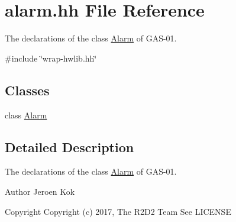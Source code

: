 \hypertarget{alarm_8hh}{}\section{alarm.\+hh File Reference}
\label{alarm_8hh}


The declarations of the class \hyperlink{class_alarm}{Alarm} of G\+A\+S-\/01.  


{\ttfamily \#include \char`\"{}wrap-\/hwlib.\+hh\char`\"{}}\newline
\subsection*{Classes}
\begin{DoxyCompactItemize}
\item 
class \hyperlink{class_alarm}{Alarm}
\end{DoxyCompactItemize}


\subsection{Detailed Description}
The declarations of the class \hyperlink{class_alarm}{Alarm} of G\+A\+S-\/01. 

\begin{DoxyAuthor}{Author}
Jeroen Kok 
\end{DoxyAuthor}
\begin{DoxyCopyright}{Copyright}
Copyright (c) 2017, The R2\+D2 Team  See L\+I\+C\+E\+N\+SE 
\end{DoxyCopyright}
